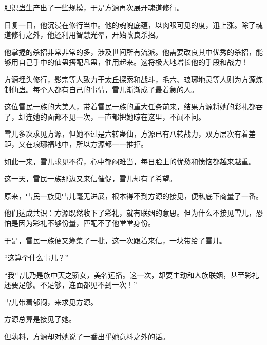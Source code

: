 \begin{this_body}
胆识蛊生产出了一些规模，于是方源再次展开魂道修行。

日复一日，他沉浸在修行当中。他的魂魄底蕴，以肉眼可见的度，迅上涨。除了魂道修行之外，他还利用智慧光晕，开始改良杀招。

他掌握的杀招非常非常的多，涉及世间所有流派。他需要改良其中优秀的杀招，能够用自己手中的仙蛊搭配凡蛊，催用起来。这将极大地增长他的手段和战力！

方源埋头修行，影宗等人致力于太丘探索和战斗，毛六、琅琊地灵等人则为方源炼制仙蛊。每个人都有自己的事情，雪儿渐渐成了最着急的人。

这位雪民一族的大美人，带着雪民一族的重大任务前来，结果方源将她的彩礼都吞了，却连她的面都不见一次，一直都把她晾在这里，不闻不问。

雪儿多次求见方源，但她不过是六转蛊仙，方源已有八转战力，双方层次有着差距，又在琅琊福地中，所以方源都一一推拒。

如此一来，雪儿求见不得，心中郁闷难当，每日脸上的忧愁和愤恼都越来越重。

这一天，雪民一族那边又来信催促，雪儿却有了希望。

原来，雪民一族见雪儿毫无进展，根本得不到方源的接见，便私底下商量了一番。

他们达成共识：方源既然收下了彩礼，就有联姻的意思。但为什么不接见雪儿，恐怕是因为彩礼不够份量，匹配不了他堂堂身份。

于是，雪民一族便又筹集了一批，这一次跟着来信，一块带给了雪儿。

“这算个什么事儿？”

“我雪儿乃是族中天之骄女，美名远播。这一次，却要主动和人族联姻，甚至彩礼还要足够。不足够，连面都见不到一次！”

雪儿带着郁闷，来求见方源。

方源总算是接见了她。

但孰料，方源却对她说了一番出乎她意料之外的话。

\end{this_body}

